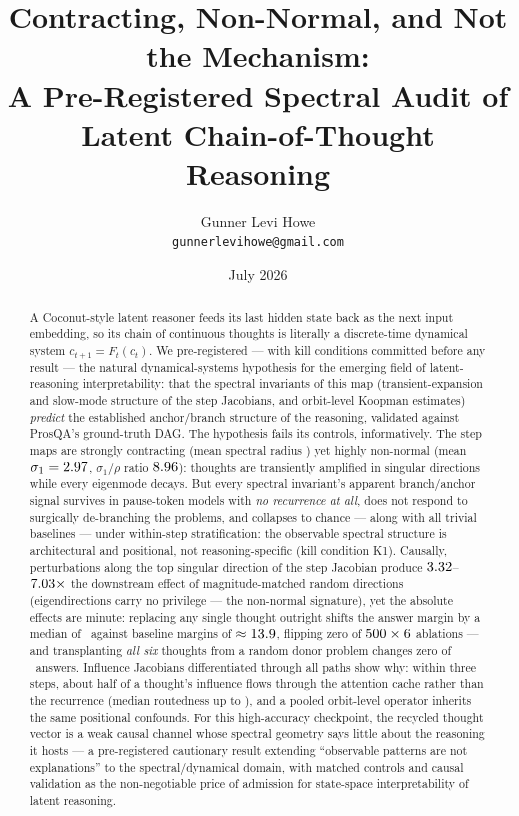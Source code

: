 \documentclass[11pt]{article}
\title{Contracting, Non-Normal, and Not the Mechanism:\\
A Pre-Registered Spectral Audit of\\
Latent Chain-of-Thought Reasoning}
\author{Gunner Levi Howe\\ \small{\texttt{gunnerlevihowe@gmail.com}}}
\date{July 2026}
\newcommand{\cthought}[1]{c_{#1}}
\newcommand{\prosqa}{ProsQA}
\newcommand{\sigmaone}{\sigma_1}
\begin{document}
\maketitle

\begin{abstract}
A Coconut-style latent reasoner feeds its last hidden state back as the next input
embedding, so its chain of continuous thoughts is literally a discrete-time
dynamical system $\cthought{t+1}=F_t(\cthought{t})$. We pre-registered --- with
kill conditions committed before any result --- the natural dynamical-systems
hypothesis for the emerging field of latent-reasoning interpretability: that the
spectral invariants of this map (transient-expansion and slow-mode structure of
the step Jacobians, and orbit-level Koopman estimates) \emph{predict} the
established anchor/branch structure of the reasoning, validated against
\prosqa's ground-truth DAG. The hypothesis fails its controls, informatively.
The step maps are strongly contracting (mean spectral radius \meanRhoMTwo) yet
highly non-normal (mean $\sigmaone=\meanSigmaMTwo$, $\sigmaone/\rho$ ratio
$8.96$): thoughts are transiently amplified in singular directions
while every eigenmode decays. But every spectral invariant's apparent
branch/anchor signal survives in pause-token models with \emph{no recurrence at
all}, does not respond to surgically de-branching the problems, and collapses to
chance --- along with all trivial baselines --- under within-step stratification:
the observable spectral structure is architectural and positional, not
reasoning-specific (kill condition K1). Causally, perturbations along the top
singular direction of the step Jacobian produce
$3.32$--$7.03\times$ the downstream effect of
magnitude-matched random directions (eigendirections carry no privilege --- the
non-normal signature), yet the absolute effects are minute: replacing any single
thought outright shifts the answer margin by a median of \ablMedian\ against
baseline margins of $\approx13.9$, flipping zero of
$500\times6$ ablations --- and transplanting \emph{all six} thoughts
from a random donor problem changes zero of \nTestProblems\ answers. Influence Jacobians differentiated through all
paths show why: within three steps, about half of a thought's influence flows
through the attention cache rather than the recurrence (median routedness up to
\routedMedianOneThree), and a pooled orbit-level operator inherits the same
positional confounds. For this high-accuracy checkpoint, the recycled thought
vector is a weak causal channel whose spectral geometry says little about the
reasoning it hosts --- a pre-registered cautionary result extending
``observable patterns are not explanations'' to the spectral/dynamical domain,
with matched controls and causal validation as the non-negotiable price of
admission for state-space interpretability of latent reasoning.
\end{abstract}
\end{document}
